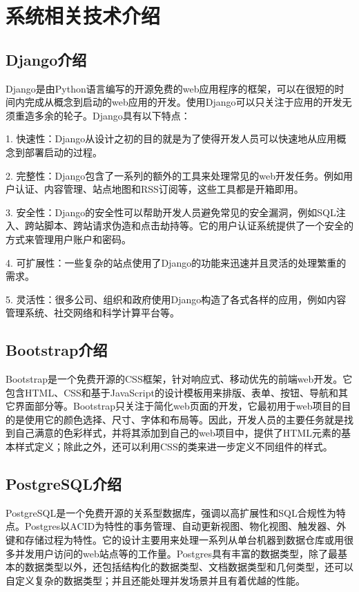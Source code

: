 \section{系统相关技术介绍}

\subsection{Django介绍}

Django是由Python语言编写的开源免费的web应用程序的框架，可以在很短的时间内完成从概念到启动的web应用的开发。使用Django可以只关注于应用的开发无须重造多余的轮子。Django具有以下特点：

1. 快速性：Django从设计之初的目的就是为了使得开发人员可以快速地从应用概念到部署启动的过程。

2. 完整性：Django包含了一系列的额外的工具来处理常见的web开发任务。例如用户认证、内容管理、站点地图和RSS订阅等，这些工具都是开箱即用。

3. 安全性：Django的安全性可以帮助开发人员避免常见的安全漏洞，例如SQL注入、跨站脚本、跨站请求伪造和点击劫持等。它的用户认证系统提供了一个安全的方式来管理用户账户和密码。

4. 可扩展性：一些复杂的站点使用了Django的功能来迅速并且灵活的处理繁重的需求。

5. 灵活性：很多公司、组织和政府使用Django构造了各式各样的应用，例如内容管理系统、社交网络和科学计算平台等。

\subsection{Bootstrap介绍}

Bootstrap是一个免费开源的CSS框架，针对响应式、移动优先的前端web开发。它包含HTML、CSS和基于JavaScript的设计模板用来排版、表单、按钮、导航和其它界面部分等。Bootstrap只关注于简化web页面的开发，它最初用于web项目的目的是使用它的颜色选择、尺寸、字体和布局等。因此，开发人员的主要任务就是找到自己满意的色彩样式，并将其添加到自己的web项目中，提供了HTML元素的基本样式定义；除此之外，还可以利用CSS的类来进一步定义不同组件的样式。

\subsection{PostgreSQL介绍}

PostgreSQL是一个免费开源的关系型数据库，强调以高扩展性和SQL合规性为特点。Postgres以ACID为特性的事务管理、自动更新视图、物化视图、触发器、外键和存储过程为特性。它的设计主要用来处理一系列从单台机器到数据仓库或用很多并发用户访问的web站点等的工作量。Postgres具有丰富的数据类型，除了最基本的数据类型以外，还包括结构化的数据类型、文档数据类型和几何类型，还可以自定义复杂的数据类型；并且还能处理并发场景并且有着优越的性能。

